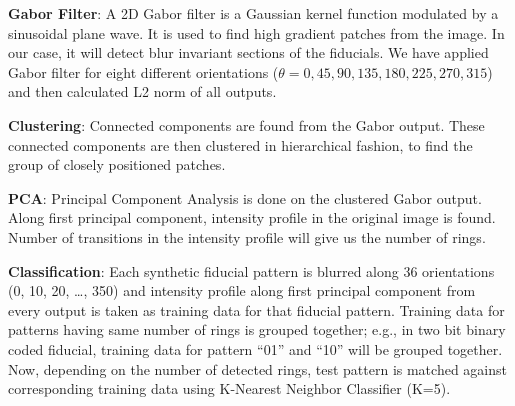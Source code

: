 \documentclass[runningheads]{llncs}
\begin{document}
\textbf{Gabor Filter}: A 2D Gabor filter is a Gaussian kernel function modulated
by a sinusoidal plane wave. It is used to find high gradient patches from the
image. In our case, it will detect blur invariant sections of the fiducials. We
have applied Gabor filter for eight different orientations ($\theta = 0, 45,
90, 135, 180, 225, 270, 315$) and then calculated L2 norm of all outputs.

\textbf{Clustering}: Connected components are found from the Gabor output. 
These connected components are then clustered in hierarchical fashion, to find
the group of closely positioned patches.

\textbf{PCA}: Principal Component Analysis is done on the clustered Gabor
output. Along first principal component, intensity profile in the original image
is found. Number of transitions in the intensity profile will give us the
number of rings.

\textbf{Classification}: Each synthetic fiducial pattern is blurred along 36
orientations (0, 10, 20, \ldots , 350) and intensity profile along first
principal component from every output is taken as training data for that fiducial pattern.
Training data for patterns having same number of rings is grouped together;
e.g., in two bit binary coded fiducial, training data for pattern ``01'' and
``10'' will be grouped together. Now, depending on the number of detected
rings, test pattern is matched against corresponding training data using
K-Nearest Neighbor Classifier (K=5).
\end{document}
